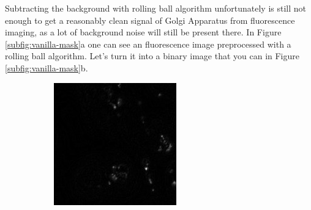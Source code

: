 Subtracting the background with rolling ball algorithm unfortunately is still not enough to get a reasonably clean signal of Golgi Apparatus from fluorescence imaging, as a lot of background noise will still be present there. In Figure \ref{subfig:vanilla-mask}a one can see an fluorescence image preprocessed with a rolling ball algorithm. Let's turn it into a binary image that you can in Figure \ref{subfig:vanilla-mask}b.
\begin{figure}[htb]
	\centering
	\begin{subfigure}[b]{0.22\textwidth}
		\centering
		\includegraphics[width=\textwidth]{bilder/preprocessing/crop_golgi_not_full_processed.png}
		\caption{}
		\label{subfig:vanilla}
	\end{subfigure}
	\hfill
	\begin{subfigure}[b]{0.22\textwidth}
		\centering

\end{subfigure}
\end{figure}
